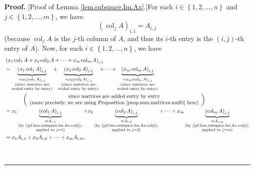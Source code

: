 \documentclass[numbers=enddot,12pt,final,onecolumn,notitlepage]{scrartcl}%
\theoremstyle{definition}
\newenvironment{proof}[1][Proof]{\noindent\textbf{#1.} }{\ \rule{0.5em}{0.5em}}
\begin{document}
\begin{proof}
[Proof of Lemma \ref{lem.subspace.Im.Ax}.]For each $i\in\left\{
1,2,\ldots,n\right\}  $ and $j\in\left\{  1,2,\ldots,m\right\}  $, we have%
\begin{equation}
\left(  \operatorname*{col}\nolimits_{j}A\right)  _{i,1}=A_{i,j}
\label{pf.lem.subspace.Im.Ax.colji}%
\end{equation}
(because $\operatorname*{col}\nolimits_{j}A$ is the $j$-th column of $A$, and
thus its $i$-th entry is the $\left(  i,j\right)  $-th entry of $A$). Now, for
each $i\in\left\{  1,2,\ldots,n\right\}  $, we have%
\begin{align}
&  \left(  x_{1}\operatorname*{col}\nolimits_{1}A+x_{2}\operatorname*{col}%
\nolimits_{2}A+\cdots+x_{m}\operatorname*{col}\nolimits_{m}A\right)
_{i,1}\nonumber\\
&  =\underbrace{\left(  x_{1}\operatorname*{col}\nolimits_{1}A\right)  _{i,1}%
}_{\substack{=x_{1}\left(  \operatorname*{col}\nolimits_{1}A\right)
_{i,1}\\\text{(since matrices are}\\\text{scaled entry by entry)}%
}}+\underbrace{\left(  x_{2}\operatorname*{col}\nolimits_{2}A\right)  _{i,1}%
}_{\substack{=x_{2}\left(  \operatorname*{col}\nolimits_{2}A\right)
_{i,1}\\\text{(since matrices are}\\\text{scaled entry by entry)}}%
}+\cdots+\underbrace{\left(  x_{m}\operatorname*{col}\nolimits_{m}A\right)
_{i,1}}_{\substack{=x_{m}\left(  \operatorname*{col}\nolimits_{m}A\right)
_{i,1}\\\text{(since matrices are}\\\text{scaled entry by entry)}}}\nonumber\\
&  \ \ \ \ \ \ \ \ \ \ \left(
\begin{array}
[c]{c}%
\text{since matrices are added entry by entry}\\
\text{(more precisely, we are using Proposition \ref{prop.sum.matrices.multi}
here)}%
\end{array}
\right) \nonumber\\
&  =x_{1}\underbrace{\left(  \operatorname*{col}\nolimits_{1}A\right)  _{i,1}%
}_{\substack{=A_{i,1}\\\text{(by (\ref{pf.lem.subspace.Im.Ax.colji}%
),}\\\text{applied to }j=1\text{)}}}+x_{2}\underbrace{\left(
\operatorname*{col}\nolimits_{2}A\right)  _{i,1}}_{\substack{=A_{i,2}%
\\\text{(by (\ref{pf.lem.subspace.Im.Ax.colji}),}\\\text{applied to
}j=2\text{)}}}+\cdots+x_{m}\underbrace{\left(  \operatorname*{col}%
\nolimits_{m}A\right)  _{i,1}}_{\substack{=A_{i,m}\\\text{(by
(\ref{pf.lem.subspace.Im.Ax.colji}),}\\\text{applied to }j=m\text{)}%
}}\nonumber\\
&  =x_{1}A_{i,1}+x_{2}A_{i,2}+\cdots+x_{m}A_{i,m}.
\label{pf.lem.subspace.Im.Ax.0}%
\end{align}



\end{proof}
\end{document}
